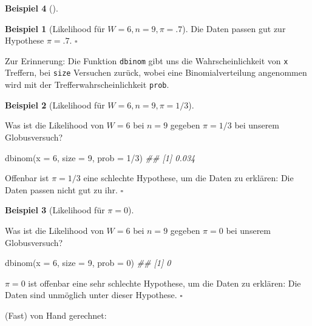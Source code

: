\documentclass[
  ngerman,
  letterpaper,
  twoside,
  open=any]{scrbook}
\newenvironment{Shaded}{\begin{snugshade}}{\end{snugshade}}
\newcommand{\AttributeTok}[1]{\textcolor[rgb]{0.40,0.45,0.13}{#1}}
\newcommand{\DecValTok}[1]{\textcolor[rgb]{0.68,0.00,0.00}{#1}}
\newcommand{\DocumentationTok}[1]{\textcolor[rgb]{0.37,0.37,0.37}{\textit{#1}}}
\newcommand{\FunctionTok}[1]{\textcolor[rgb]{0.28,0.35,0.67}{#1}}
\newcommand{\NormalTok}[1]{\textcolor[rgb]{0.00,0.23,0.31}{#1}}
\newcommand{\SpecialCharTok}[1]{\textcolor[rgb]{0.37,0.37,0.37}{#1}}
\theoremstyle{definition}
\newtheorem{example}{Beispiel}[chapter]
\theoremstyle{plain}
\theoremstyle{definition}
\theoremstyle{definition}
\theoremstyle{remark}
\begin{document}
\begin{example}[]
\begin{example}[Likelihood für
\(W = 6, n = 9, \pi=.7\)]
Die Daten passen gut zur Hypothese \(\pi=.7\). \(\square\)

\end{example}

Zur Erinnerung: Die Funktion \texttt{dbinom} gibt uns die
Wahrscheinlichkeit von \texttt{x} Treffern, bei \texttt{size} Versuchen
zurück, wobei eine Binomialverteilung angenommen wird mit der
Trefferwahrscheinlichkeit \texttt{prob}.

\begin{example}[Likelihood für
\(W = 6, n = 9, \pi=1/3\)]\protect\hypertarget{exm-globus2}{}\label{exm-globus2}

Was ist die Likelihood von \(W=6\) bei \(n=9\) gegeben \(\pi=1/3\) bei
unserem Globusversuch?

\begin{Shaded}
\begin{Highlighting}[]
\FunctionTok{dbinom}\NormalTok{(}\AttributeTok{x =} \DecValTok{6}\NormalTok{, }\AttributeTok{size =} \DecValTok{9}\NormalTok{, }\AttributeTok{prob =} \DecValTok{1}\SpecialCharTok{/}\DecValTok{3}\NormalTok{)}
\DocumentationTok{\#\# [1] 0.034}
\end{Highlighting}
\end{Shaded}

Offenbar ist \(\pi=1/3\) eine schlechte Hypothese, um die Daten zu
erklären: Die Daten passen nicht gut zu ihr. \(\square\)

\end{example}

\begin{example}[Likelihood für
\(\pi=0\)]\protect\hypertarget{exm-globus697}{}\label{exm-globus697}

Was ist die Likelihood von \(W=6\) bei \(n=9\) gegeben \(\pi=0\) bei
unserem Globusversuch?

\begin{Shaded}
\begin{Highlighting}[]
\FunctionTok{dbinom}\NormalTok{(}\AttributeTok{x =} \DecValTok{6}\NormalTok{, }\AttributeTok{size =} \DecValTok{9}\NormalTok{, }\AttributeTok{prob =} \DecValTok{0}\NormalTok{)}
\DocumentationTok{\#\# [1] 0}
\end{Highlighting}
\end{Shaded}

\(\pi=0\) ist offenbar eine sehr schlechte Hypothese, um die Daten zu
erklären: Die Daten sind unmöglich unter dieser Hypothese. \(\square\)

(Fast) von Hand gerechnet:


\end{example}
\end{example}
\end{document}
